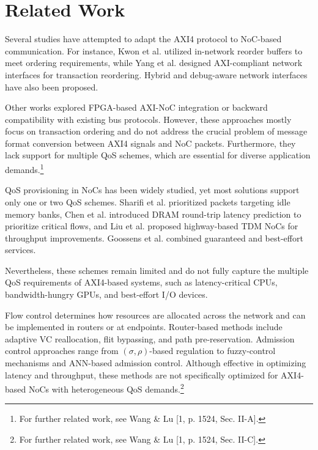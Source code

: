\section{Related Work}

\iffalse
{}
Several studies have attempted to adapt the AXI4 protocol to NoC-based communication. For instance, Kwon et al.\cite{yang_nisar_2007} utilized in-network reorder buffers to meet ordering requirements, while Yang et al.\cite{kwon_-network_2009} designed AXI-compliant network interfaces for transaction reordering. Hybrid and debug-aware network interfaces have also been proposed.

Other works explored FPGA-based AXI-NoC integration or backward compatibility with existing bus protocols. However, these approaches mostly focus on transaction ordering and do not address the crucial problem of message format conversion between AXI4 signals and NoC packets. Furthermore, they lack support for multiple QoS schemes, which are essential for diverse application demands.\footnote{For further related work, see Wang \& Lu [1, p. 1524, Sec. II-A].} 


QoS provisioning in NoCs has been widely studied, yet most solutions support only one or two QoS schemes. Sharifi et al.\cite{sharifi_addressing_2012} prioritized packets targeting idle memory banks, Chen et al.\cite{chen_round-trip_2017} introduced DRAM round-trip latency prediction to prioritize critical flows, and Liu et al.\cite{liu_highway_2015} proposed highway-based TDM NoCs for throughput improvements. Goossens et al.\cite{goossens_aethereal_2005} combined guaranteed and best-effort services. 

Nevertheless, these schemes remain limited and do not fully capture the multiple QoS requirements of AXI4-based systems, such as latency-critical CPUs, bandwidth-hungry GPUs, and best-effort I/O devices. 


Flow control determines how resources are allocated across the network and can be implemented in routers or at endpoints. Router-based methods include adaptive \ac{VC} reallocation, flit bypassing, and path pre-reservation. Admission control approaches range from $(\sigma,\rho)$-based regulation to fuzzy-control mechanisms and ANN-based admission control. Although effective in optimizing latency and throughput, these methods are not specifically optimized for AXI4-based NoCs with heterogeneous QoS demands.\footnote{For further related work, see Wang \& Lu [1, p. 1524, Sec. II-C].}  


